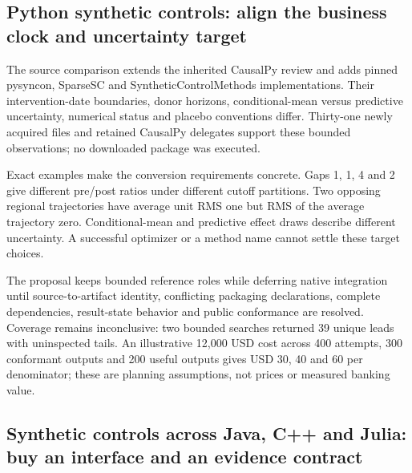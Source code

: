 \hypertarget{python-synthetic-controls-align-the-business-clock-and-uncertainty-target}{%
\subsection{Python synthetic controls: align the business clock and
uncertainty
target}\label{python-synthetic-controls-align-the-business-clock-and-uncertainty-target}}

The source comparison extends the inherited CausalPy review and adds
pinned pysyncon, SparseSC and SyntheticControlMethods implementations.
Their intervention-date boundaries, donor horizons, conditional-mean
versus predictive uncertainty, numerical status and placebo conventions
differ. Thirty-one newly acquired files and retained CausalPy delegates
support these bounded observations; no downloaded package was executed.
\citep{exec25_synthpy_causalpy,exec25_synthpy_pysyncon,exec25_synthpy_sparse,exec25_synthpy_methods}

Exact examples make the conversion requirements concrete. Gaps 1, 1, 4
and 2 give different pre/post ratios under different cutoff partitions.
Two opposing regional trajectories have average unit RMS one but RMS of
the average trajectory zero. Conditional-mean and predictive effect
draws describe different uncertainty. A successful optimizer or a method
name cannot settle these target choices. \citep{exec25_synthpy_choice}

The proposal keeps bounded reference roles while deferring native
integration until source-to-artifact identity, conflicting packaging
declarations, complete dependencies, result-state behavior and public
conformance are resolved. Coverage remains inconclusive: two bounded
searches returned 39 unique leads with uninspected tails. An
illustrative 12,000 USD cost across 400 attempts, 300 conformant outputs
and 200 useful outputs gives USD 30, 40 and 60 per denominator; these
are planning assumptions, not prices or measured banking value.
\citep{exec25_synthpy_choice}

\hypertarget{synthetic-controls-across-java-c-and-julia-buy-an-interface-and-an-evidence-contract}{%
\subsection{Synthetic controls across Java, C++ and Julia: buy an
interface and an evidence
contract}\label{synthetic-controls-across-java-c-and-julia-buy-an-interface-and-an-evidence-contract}}

